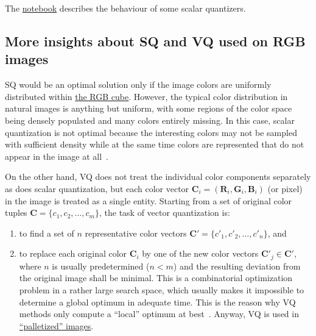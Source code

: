 The \href{https://github.com/Sistemas-Multimedia/Sistemas-Multimedia.github.io/blob/master/milestones/05-RGB_quantization/digital_quantization.ipynb}{notebook} describes the behaviour of some scalar quantizers.

\subsection{More insights about SQ and VQ used on RGB images}
SQ would be an optimal solution only if the image colors are uniformly
distributed within
\href{https://en.wikipedia.org/wiki/RGB_color_model}{the RGB
  cube}. However, the typical color distribution in natural images is
anything but uniform, with some regions of the color space being
densely populated and many colors entirely missing. In this case,
scalar quantization is not optimal because the interesting colors may
not be sampled with suﬃcient density while at the same time colors are
represented that do not appear in the image at
all~\cite{burger2016digital}.

On the other hand, VQ does not treat the individual color components
separately as does scalar quantization, but each color vector
${\mathbf C}_i = ({\mathbf R}_i, {\mathbf G}_i, {\mathbf B}_i )$ (or
pixel) in the image is treated as a single entity. Starting from a set
of original color tuples ${\mathbf C} = \{c_1, c_2, \ldots ,c_m\}$,
the task of vector quantization is:
\begin{enumerate}
\item to ﬁnd a set of $n$ representative color vectors
  ${\mathbf C}' = \{c'_1, c'_2 ,\ldots , c'_n \}$, and
\item to replace each original color ${\mathbf C}_i$ by one of the new
  color vectors ${\mathbf C}'_j\in {\mathbf C}'$, where $n$ is usually
  predetermined ($n < m$) and the resulting deviation from the
  original image shall be minimal. This is a combinatorial
  optimization problem in a rather large search space, which usually
  makes it impossible to determine a global optimum in adequate
  time. This is the reason why VQ methods only compute a ``local''
  optimum at best~\cite{burger2016digital}. Anyway, VQ is used in
  \href{https://en.wikipedia.org/wiki/Palette_(computing)}{``palletized''
    images}.
\end{enumerate}

